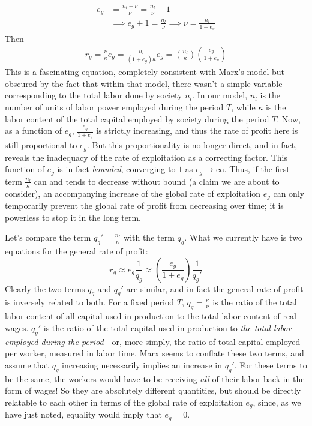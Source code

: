 \documentclass{article}
\theoremstyle{definition}
\theoremstyle{plain}
\theoremstyle{theorem}
\begin{document}
\begin{align}
	e_g &= \frac{n_l-\nu}{\nu} = \frac{n_l}{\nu}-1  \\
	&\implies e_g+1 = \frac{n_l}{\nu} \implies \nu = \frac{n_l}{1+e_g} 
\end{align}
Then 
\begin{align}
	r_g = \frac{\nu}{\kappa}e_g = \frac{n_l}{(1+e_g)\kappa}e_g = \left(\frac{n_l}{\kappa}\right) \left(\frac{e_g}{1+e_g} \right)
\end{align}
This is a fascinating equation, completely consistent with Marx's model but obscured by the fact that within that model, there wasn't a simple variable corresponding to the total labor done by society $n_l$. In our model, $n_l$ is the number of units of labor power employed during the period $T$, while $\kappa$ is the labor content of the total capital employed by society during the period $T$. Now, as a function of $e_g$, $\frac{e_g}{1+e_g}$ is strictly increasing, and thus the rate of profit here is still proportional to $e_g$. But this proportionality is no longer direct, and in fact, reveals the inadequacy of the rate of exploitation as a correcting factor. This function of $e_g$ is in fact \textit{bounded}, converging to $1$ as $e_g \to \infty$. Thus, if the first term $\frac{n_l}{\kappa}$ can and tends to decrease without bound (a claim we are about to consider), an accompanying increase of the global rate of exploitation $e_g$ can only temporarily prevent the global rate of profit from decreasing over time; it is powerless to stop it in the long term. \par 
Let's compare the term $q_g' = \frac{n_l}{\kappa}$ with the term $q_g$. What we currently have is two equations for the general rate of profit:
\[ r_g \approx e_g\frac{1}{q_g} \approx \left(\frac{e_g}{1+e_g}\right)\frac{1}{q_g'} \]
Clearly the two terms $q_g$ and $q_g'$ are similar, and in fact the general rate of profit is inversely related to both. For a fixed period $T$, $q_g = \frac{\kappa}{\nu}$ is the ratio of the total labor content of all capital used in production to the total labor content of real wages. $q_g'$ is the ratio of the total capital used in production to \textit{the total labor employed during the period} - or, more simply, the ratio of total capital employed per worker, measured in labor time. Marx seems to conflate these two terms, and assume that $q_g$ increasing necessarily implies an increase in $q_g'$. For these terms to be the same, the workers would have to be receiving \textit{all} of their labor back in the form of wages! So they are absolutely different quantities, but should be directly relatable to each other in terms of the global rate of exploitation $e_g$, since, as we have just noted, equality would imply that $e_g = 0$. \par 
\end{document}

